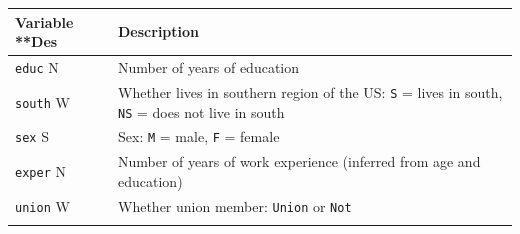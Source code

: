 \documentclass[
]{report}
\begin{document}
\begin{longtable}[]{@{}ll@{}}
\toprule
\begin{minipage}[b]{0.08\columnwidth}\raggedright
\textbf{Variable} \textbar{} **Des\strut
\end{minipage} & \begin{minipage}[b]{0.86\columnwidth}\raggedright
\textbf{Description} \textbar{}\strut
\end{minipage}\tabularnewline
\midrule
\endhead
\begin{minipage}[t]{0.08\columnwidth}\raggedright
\texttt{educ} \textbar{} N\strut
\end{minipage} & \begin{minipage}[t]{0.86\columnwidth}\raggedright
Number of years of education \textbar{}\strut
\end{minipage}\tabularnewline
\begin{minipage}[t]{0.08\columnwidth}\raggedright
\texttt{south} \textbar{} W\strut
\end{minipage} & \begin{minipage}[t]{0.86\columnwidth}\raggedright
Whether lives in southern region of the US: \texttt{S} = lives in south, \texttt{NS} = does not live in south \textbar{}\strut
\end{minipage}\tabularnewline
\begin{minipage}[t]{0.08\columnwidth}\raggedright
\texttt{sex} \textbar{} S\strut
\end{minipage} & \begin{minipage}[t]{0.86\columnwidth}\raggedright
Sex: \texttt{M} = male, \texttt{F} = female \textbar{}\strut
\end{minipage}\tabularnewline
\begin{minipage}[t]{0.08\columnwidth}\raggedright
\texttt{exper} \textbar{} N\strut
\end{minipage} & \begin{minipage}[t]{0.86\columnwidth}\raggedright
Number of years of work experience (inferred from age and education) \textbar{}\strut
\end{minipage}\tabularnewline
\begin{minipage}[t]{0.08\columnwidth}\raggedright
\texttt{union} \textbar{} W\strut
\end{minipage} & \begin{minipage}[t]{0.86\columnwidth}\raggedright
Whether union member: \texttt{Union} or \texttt{Not} \textbar{}\strut
\end{minipage}\tabularnewline
\begin{minipage}[t]{0.08\columnwidth}\raggedright

\end{minipage}
\end{longtable}
\end{document}
